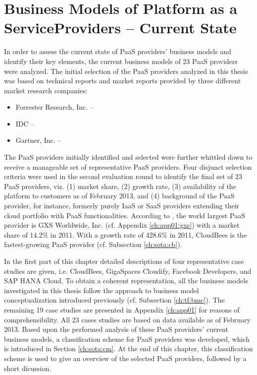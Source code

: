 \chapter[Business Models of Platform as a Service Providers -- Current State]{Business Models of Platform as a Service\protect\linebreak Providers -- Current State}\label{ch:sota}

In order to assess the current state of \ac{PaaS} providers' business models and identify their key elements, the current business models of 23 \ac{PaaS} providers were analyzed. The initial selection of the \ac{PaaS} providers analyzed in this thesis was based on technical reports and market reports provided by three different market research companies:
\begin{itemize}[parsep=0pt, topsep=0pt, itemsep=0pt]
	\item Forrester Research, Inc. -- \citet{Rymer2011,Ried2011a}
	\item \ac{IDC} -- \citet{Bradshaw2012,Hendrick2012, Hendrick2012a}
	\item Gartner, Inc. -- \citet{Smith2012}
\end{itemize}
The \ac{PaaS} providers initially identified and selected were further whittled down to receive a manageable set of representative \ac{PaaS} providers. Four disjunct selection criteria were used in the second evaluation round to identify the final set of 23 \ac{PaaS} providers, viz. (1) market share, (2) growth rate, (3) availability of the platform to customers as of February 2013, and (4) background of the \ac{PaaS} provider, for instance, formerly purely \ac{IaaS} or \ac{SaaS} providers extending their cloud portfolio with \ac{PaaS} functionalities. According to \citet{Hendrick2012}, the world largest \ac{PaaS} provider is GXS Worldwide, Inc. (cf. Appendix \ref{ch:app01:gxs}) with a market share of 14.2\% in 2011. With a growth rate of 428.6\% in 2011, CloudBees is the fastest-growing \ac{PaaS} provider (cf. Subsection \ref{ch:sota:cb}).

In the first part of this chapter detailed descriptions of four representative case studies are given, i.e. CloudBees, GigaSpaces Cloudify, Facebook Developers, and SAP HANA Cloud. To obtain a coherent representation, all the business models investigated in this thesis follow the approach to business model conceptualization introduced previously (cf. Subsection \ref{ch:tf:bmc}). The remaining 19 case studies are presented in Appendix \ref{ch:app01} for reasons of comprehensibility. All 23 cases studies are based on data available as of February 2013. Based upon the performed analysis of these \ac{PaaS} providers' current business models, a classification scheme for \ac{PaaS} providers was developed, which is introduced in Section \ref{ch:sota:cm}. At the end of this chapter, this classification scheme is used to give an overview of the selected \ac{PaaS} providers, followed by a short dicussion.

